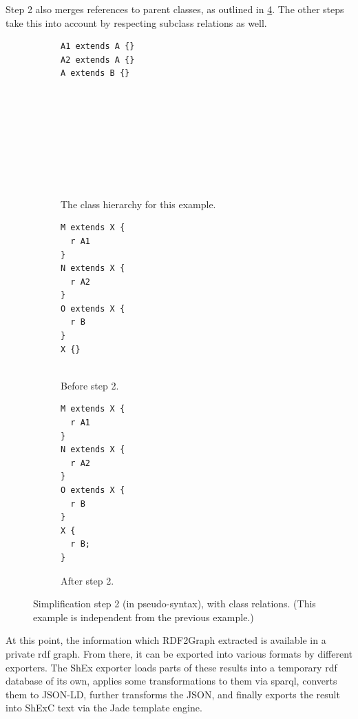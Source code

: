 Step 2 also merges references to parent classes,
as outlined in \cref{fig:simplify-7.4.2-classes}.
The other steps take this into account by respecting subclass relations as well.

\begin{figure}[ht]
  \begin{subfigure}[t]{0.3\textwidth}
    \begin{lstlisting}[showlines=true]
A1 extends A {}
A2 extends A {}
A extends B {}









    \end{lstlisting}
    \caption{The class hierarchy for this example.}
    \label{fig:simplify-7.4.2-classes-hierarchy}
  \end{subfigure}
  \begin{subfigure}[t]{0.3\textwidth}
    \begin{lstlisting}[showlines=true]
M extends X {
  r A1
}
N extends X {
  r A2
}
O extends X {
  r B
}
X {}


    \end{lstlisting}
    \caption{Before step 2.}
    \label{fig:simplify-7.4.2-classes-before}
  \end{subfigure}
  \begin{subfigure}[t]{0.3\textwidth}
    \begin{lstlisting}
M extends X {
  r A1
}
N extends X {
  r A2
}
O extends X {
  r B
}
X {
  r B;
}
    \end{lstlisting}
    \caption{After step 2.}
    \label{fig:simplify-7.4.2-classes-after}
  \end{subfigure}
  \caption[Simplification step 2, with class relations.]{
    Simplification step 2 (in pseudo-syntax), with class relations.
    (This example is independent from the previous example.)
  }
  \label{fig:simplify-7.4.2-classes}
\end{figure}

At this point, the information which RDF2Graph extracted is available in a private \gls{rdf} graph.
From there, it can be exported into various formats by different exporters.
The ShEx exporter loads parts of these results into a temporary \gls{rdf} database of its own,
applies some transformations to them via \gls{sparql},
converts them to JSON-LD,
further transforms the JSON,
and finally exports the result into ShExC text via the Jade template engine.

